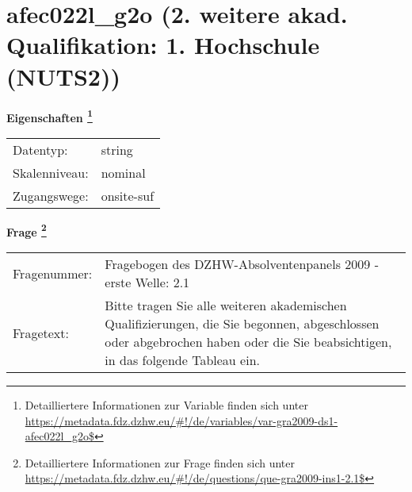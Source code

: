 
    \setcounter{footnote}{0}

    \vspace*{-1.8cm}
	\section{afec022l\_g2o (2. weitere akad. Qualifikation: 1. Hochschule (NUTS2))}
	\label{section:afec022l_g2o}



    \vspace*{0.5cm}
    \noindent\textbf{Eigenschaften
	\footnote{Detailliertere Informationen zur Variable finden sich unter
		\url{https://metadata.fdz.dzhw.eu/\#!/de/variables/var-gra2009-ds1-afec022l_g2o$}}}\\
	\begin{tabularx}{\hsize}{@{}lX}
	Datentyp: & string \\
	Skalenniveau: & nominal \\
	Zugangswege: &
	  onsite-suf
 \\
    \end{tabularx}



				\vspace*{0.5cm}
                \noindent\textbf{Frage
	                \footnote{Detailliertere Informationen zur Frage finden sich unter
		              \url{https://metadata.fdz.dzhw.eu/\#!/de/questions/que-gra2009-ins1-2.1$}}}\\
				\begin{tabularx}{\hsize}{@{}lX}
					Fragenummer: &
					  Fragebogen des DZHW-Absolventenpanels 2009 - erste Welle:
					  2.1
 \\
					Fragetext: & Bitte tragen Sie alle weiteren akademischen Qualifizierungen, die Sie begonnen, abgeschlossen oder abgebrochen haben oder die Sie beabsichtigen, in das folgende Tableau ein. \\
				\end{tabularx}






